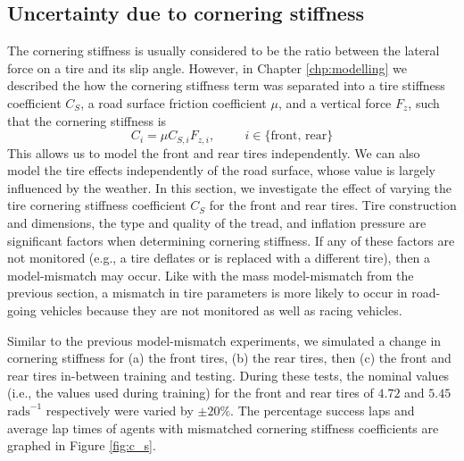 
% 

\subsection{Uncertainty due to cornering stiffness}

The cornering stiffness is usually considered to be the ratio between the lateral force on a tire and its slip angle.
However, in Chapter \ref{chp:modelling} we described the how the cornering stiffness term was separated into a tire stiffness coefficient $C_S$, a road surface friction coefficient $\mu$, and a vertical force $F_z$, such that the cornering stiffness is 
\begin{equation}\label{eq:C_S_mismatch}
    C_i = \mu C_{S,i} F_{z,i}, \hspace{1cm} i\in\{\text{front, rear}\}
\end{equation}
This allows us to model the front and rear tires independently.
We can also model the tire effects independently of the road surface, whose value is largely influenced by the weather.
In this section, we investigate the effect of varying the tire cornering stiffness coefficient $C_S$ for the front and rear tires.
Tire construction and dimensions, the type and quality of the tread, and inflation pressure are significant factors when determining cornering stiffness.
If any of these factors are not monitored (e.g., a tire deflates or is replaced with a different tire), then a model-mismatch may occur.
Like with the mass model-mismatch from the previous section, a mismatch in tire parameters is more likely to occur in road-going vehicles because they are not monitored as well as racing vehicles.

Similar to the previous model-mismatch experiments, we simulated a change in cornering stiffness for (a) the front tires, (b) the rear tires, then (c) the front and rear tires in-between training and testing.
During these tests, the nominal values (i.e., the values used during training) for the front and rear tires of $4.72$ and $5.45$ $\text{rads}^{-1}$ respectively were varied by $\pm 20 \%$. 
The percentage success laps and average lap times of agents with mismatched cornering stiffness coefficients are graphed in Figure \ref{fig:c_s}.

